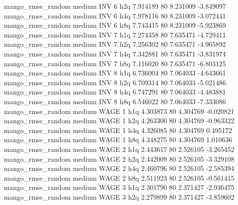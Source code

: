mango_rmse_random     medium      INV                 6                  h2q  7.914189 80       8.231009          -3.849097
mango_rmse_random     medium      INV                 6                  h4q  7.978116 80       8.231009          -3.072441
mango_rmse_random     medium      INV                 6                  h8q  7.743415 80       8.231009          -5.923869
mango_rmse_random     medium      INV                 7                  h1q  7.274358 80       7.635471          -4.729411
mango_rmse_random     medium      INV                 7                  h2q  7.256302 80       7.635471          -4.965892
mango_rmse_random     medium      INV                 7                  h4q  7.342881 80       7.635471          -3.831974
mango_rmse_random     medium      INV                 7                  h8q  7.116020 80       7.635471          -6.803125
mango_rmse_random     medium      INV                 8                  h1q  6.736004 80       7.064033          -4.643661
mango_rmse_random     medium      INV                 8                  h2q  6.709314 80       7.064033          -5.021486
mango_rmse_random     medium      INV                 8                  h4q  6.747291 80       7.064033          -4.483881
mango_rmse_random     medium      INV                 8                  h8q  6.546022 80       7.064033          -7.333086
mango_rmse_random     medium     WAGE                 1                  h1q  4.303873 80       4.304769          -0.020821
mango_rmse_random     medium     WAGE                 1                  h2q  4.263300 80       4.304769          -0.963322
mango_rmse_random     medium     WAGE                 1                  h4q  4.326085 80       4.304769           0.495172
mango_rmse_random     medium     WAGE                 1                  h8q  4.348275 80       4.304769           1.010636
mango_rmse_random     medium     WAGE                 2                  h1q  2.443617 80       2.526105          -3.265452
mango_rmse_random     medium     WAGE                 2                  h2q  2.442009 80       2.526105          -3.329108
mango_rmse_random     medium     WAGE                 2                  h4q  2.460796 80       2.526105          -2.585394
mango_rmse_random     medium     WAGE                 2                  h8q  2.511923 80       2.526105          -0.561415
mango_rmse_random     medium     WAGE                 3                  h1q  2.301790 80       2.371427          -2.936475
mango_rmse_random     medium     WAGE                 3                  h2q  2.279899 80       2.371427          -3.859602
